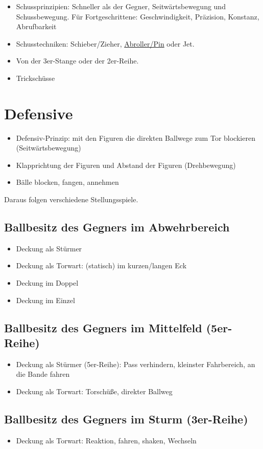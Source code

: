 \begin{itemize}
\item Schussprinzipien: Schneller als der Gegner, Seitwärtsbewegung und Schussbewegung. Für Fortgeschrittene: Geschwindigkeit, Präzision, Konstanz, Abrufbarkeit
\item Schusstechniken: Schieber/Zieher, \href{http://ungeblogtkickern.blogspot.de/2014/07/schritt-fur-schritt-pin-schieen.html}{Abroller/Pin} oder Jet.
\item Von der 3er-Stange oder der 2er-Reihe.
\item Trickschüsse
\end{itemize}





\section{Defensive}
\label{technik:defensive}

\begin{itemize}
\item Defensiv-Prinzip: mit den Figuren die direkten Ballwege zum Tor blockieren (Seitwärtsbewegung)  
\item Klapprichtung der Figuren und Abstand der Figuren (Drehbewegung)
\item Bälle blocken, fangen, annehmen 
\end{itemize}
Daraus folgen verschiedene Stellungsspiele.


\subsection{Ballbesitz des Gegners im Abwehrbereich}
\label{technik:defensive:gegnerabwehr}

\begin{itemize}
\item Deckung als Stürmer
\item Deckung als Torwart: (statisch) im kurzen/langen Eck
\item Deckung im Doppel
\item Deckung im Einzel
\end{itemize}


\subsection{Ballbesitz des Gegners im Mittelfeld (5er-Reihe)}
\label{technik:defensive:gegnermittelfeld}

\begin{itemize}
\item Deckung als Stürmer (5er-Reihe): Pass verhindern, kleinster Fahrbereich, an die Bande fahren
\item Deckung als Torwart: Torschüße, direkter Ballweg
\end{itemize}


\subsection{Ballbesitz des Gegners im Sturm (3er-Reihe)}
\label{technik:defensive:gegnersturm}

\begin{itemize}
\item Deckung als Torwart: Reaktion, fahren, shaken, Wechseln
\end{itemize}

